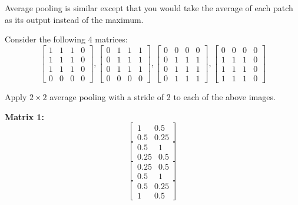 Average pooling is similar except that you would take the average of each patch as its output instead of the maximum.

Consider the following 4 matrices:
$$
\begin{bmatrix}
    1 & 1 & 1 & 0 \\
    1 & 1 & 1 & 0 \\
    1 & 1 & 1 & 0 \\
    0 & 0 & 0 & 0
\end{bmatrix},
%
\begin{bmatrix}
    0 & 1 & 1 & 1 \\
    0 & 1 & 1 & 1 \\
    0 & 1 & 1 & 1 \\
    0 & 0 & 0 & 0
\end{bmatrix},
%
\begin{bmatrix}
	0 & 0 & 0 & 0 \\
    0 & 1 & 1 & 1 \\
    0 & 1 & 1 & 1 \\
    0 & 1 & 1 & 1
\end{bmatrix},
%
\begin{bmatrix}
    0 & 0 & 0 & 0 \\
    1 & 1 & 1 & 0 \\
    1 & 1 & 1 & 0 \\
    1 & 1 & 1 & 0
\end{bmatrix}
$$
\problem[3]

Apply $2 \times 2$ average pooling with a stride of 2 to each of the above images.

\begin{subsolution}

\textbf{Matrix 1:}
$$\begin{bmatrix} 1 & 0.5 \\ 0.5 & 0.25 \end{bmatrix}$$
$$\begin{bmatrix} 0.5 & 1 \\ 0.25 & 0.5 \end{bmatrix}$$
$$\begin{bmatrix} 0.25 & 0.5 \\ 0.5 & 1 \end{bmatrix}$$
$$\begin{bmatrix} 0.5 & 0.25 \\ 1 & 0.5 \end{bmatrix}$$


\end{subsolution}

\newpage


